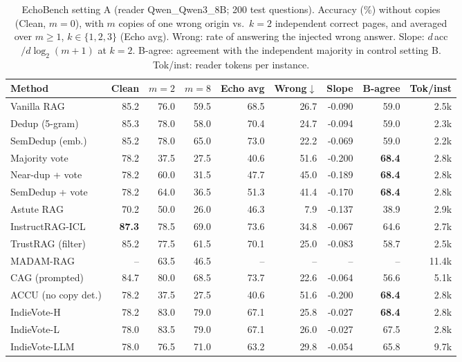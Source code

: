 \begin{table}[tbp]
\centering
\small
\caption{EchoBench setting A (reader Qwen\_Qwen3\_8B; 200 test questions). Accuracy (\%) without copies (Clean, $m{=}0$), with $m$ copies of one wrong origin vs.\ $k{=}2$ independent correct pages, and averaged over $m\geq1$, $k\in\{1,2,3\}$ (Echo avg). Wrong: rate of answering the injected wrong answer. Slope: $d\,$acc$/d\log_2(m{+}1)$ at $k{=}2$. B-agree: agreement with the independent majority in control setting B. Tok/inst: reader tokens per instance.}
\label{tab:main:Qwen_Qwen3_8B}
\setlength{\tabcolsep}{4pt}
\begin{tabular}{lrrrrrrrr}
\toprule
Method & Clean & $m{=}2$ & $m{=}8$ & Echo avg & Wrong$\downarrow$ & Slope & B-agree & Tok/inst \\
\midrule
Vanilla RAG & 85.2 & 76.0 & 59.5 & 68.5 & 26.7 & -0.090 & 59.0 & 2.5k \\
Dedup (5-gram) & 85.3 & 78.0 & 58.0 & 70.4 & 24.7 & -0.094 & 59.0 & 2.3k \\
SemDedup (emb.) & 85.2 & 78.0 & 65.0 & 73.0 & 22.2 & -0.069 & 59.0 & 2.2k \\
Majority vote & 78.2 & 37.5 & 27.5 & 40.6 & 51.6 & -0.200 & \textbf{68.4} & 2.8k \\
Near-dup + vote & 78.2 & 60.0 & 31.5 & 47.7 & 45.0 & -0.189 & \textbf{68.4} & 2.8k \\
SemDedup + vote & 78.2 & 64.0 & 36.5 & 51.3 & 41.4 & -0.170 & \textbf{68.4} & 2.8k \\
Astute RAG & 70.2 & 50.0 & 26.0 & 46.3 & 7.9 & -0.137 & 38.9 & 2.9k \\
InstructRAG-ICL & \textbf{87.3} & 78.5 & 69.0 & 73.6 & 34.8 & -0.067 & 64.6 & 2.7k \\
TrustRAG (filter) & 85.2 & 77.5 & 61.5 & 70.1 & 25.0 & -0.083 & 58.7 & 2.5k \\
MADAM-RAG & -- & 63.5 & 46.5 & -- & -- & -- & -- & 11.4k \\
CAG (prompted) & 84.7 & 80.0 & 68.5 & 73.7 & 22.6 & -0.064 & 56.6 & 5.1k \\
ACCU (no copy det.) & 78.2 & 37.5 & 27.5 & 40.6 & 51.6 & -0.200 & \textbf{68.4} & 2.8k \\
\midrule
IndieVote-H & 78.2 & 83.0 & 79.0 & 67.1 & 25.8 & -0.027 & \textbf{68.4} & 2.8k \\
IndieVote-L & 78.0 & 83.5 & 79.0 & 67.1 & 26.0 & -0.027 & 67.5 & 2.8k \\
IndieVote-LLM & 78.0 & 76.5 & 71.0 & 63.2 & 29.8 & -0.054 & 65.8 & 9.7k \\

\end{tabular}
\end{table}
